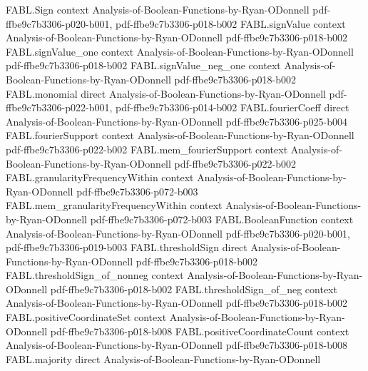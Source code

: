 \begin{theorem}
\label{FABL.coordinateExpectation_apply}
\leanok
{}
\proofstep
  {FABL.Sign}
  {context}
  {Analysis-of-Boolean-Functions-by-Ryan-ODonnell}
  {pdf-ffbe9c7b3306-p020-b001,
    pdf-ffbe9c7b3306-p018-b002}
\proofstep
  {FABL.signValue}
  {context}
  {Analysis-of-Boolean-Functions-by-Ryan-ODonnell}
  {pdf-ffbe9c7b3306-p018-b002}
\proofstep
  {FABL.signValue_one}
  {context}
  {Analysis-of-Boolean-Functions-by-Ryan-ODonnell}
  {pdf-ffbe9c7b3306-p018-b002}
\proofstep
  {FABL.signValue_neg_one}
  {context}
  {Analysis-of-Boolean-Functions-by-Ryan-ODonnell}
  {pdf-ffbe9c7b3306-p018-b002}
\proofstep
  {FABL.monomial}
  {direct}
  {Analysis-of-Boolean-Functions-by-Ryan-ODonnell}
  {pdf-ffbe9c7b3306-p022-b001,
    pdf-ffbe9c7b3306-p014-b002}
\proofstep
  {FABL.fourierCoeff}
  {direct}
  {Analysis-of-Boolean-Functions-by-Ryan-ODonnell}
  {pdf-ffbe9c7b3306-p025-b004}
\proofstep
  {FABL.fourierSupport}
  {context}
  {Analysis-of-Boolean-Functions-by-Ryan-ODonnell}
  {pdf-ffbe9c7b3306-p022-b002}
\proofstep
  {FABL.mem_fourierSupport}
  {context}
  {Analysis-of-Boolean-Functions-by-Ryan-ODonnell}
  {pdf-ffbe9c7b3306-p022-b002}
\proofstep
  {FABL.granularityFrequencyWithin}
  {context}
  {Analysis-of-Boolean-Functions-by-Ryan-ODonnell}
  {pdf-ffbe9c7b3306-p072-b003}
\proofstep
  {FABL.mem_granularityFrequencyWithin}
  {context}
  {Analysis-of-Boolean-Functions-by-Ryan-ODonnell}
  {pdf-ffbe9c7b3306-p072-b003}
\proofstep
  {FABL.BooleanFunction}
  {context}
  {Analysis-of-Boolean-Functions-by-Ryan-ODonnell}
  {pdf-ffbe9c7b3306-p020-b001,
    pdf-ffbe9c7b3306-p019-b003}
\proofstep
  {FABL.thresholdSign}
  {direct}
  {Analysis-of-Boolean-Functions-by-Ryan-ODonnell}
  {pdf-ffbe9c7b3306-p018-b002}
\proofstep
  {FABL.thresholdSign_of_nonneg}
  {context}
  {Analysis-of-Boolean-Functions-by-Ryan-ODonnell}
  {pdf-ffbe9c7b3306-p018-b002}
\proofstep
  {FABL.thresholdSign_of_neg}
  {context}
  {Analysis-of-Boolean-Functions-by-Ryan-ODonnell}
  {pdf-ffbe9c7b3306-p018-b002}
\proofstep
  {FABL.positiveCoordinateSet}
  {context}
  {Analysis-of-Boolean-Functions-by-Ryan-ODonnell}
  {pdf-ffbe9c7b3306-p018-b008}
\proofstep
  {FABL.positiveCoordinateCount}
  {context}
  {Analysis-of-Boolean-Functions-by-Ryan-ODonnell}
  {pdf-ffbe9c7b3306-p018-b008}
\proofstep
  {FABL.majority}
  {direct}
  {Analysis-of-Boolean-Functions-by-Ryan-ODonnell}

\end{theorem}
